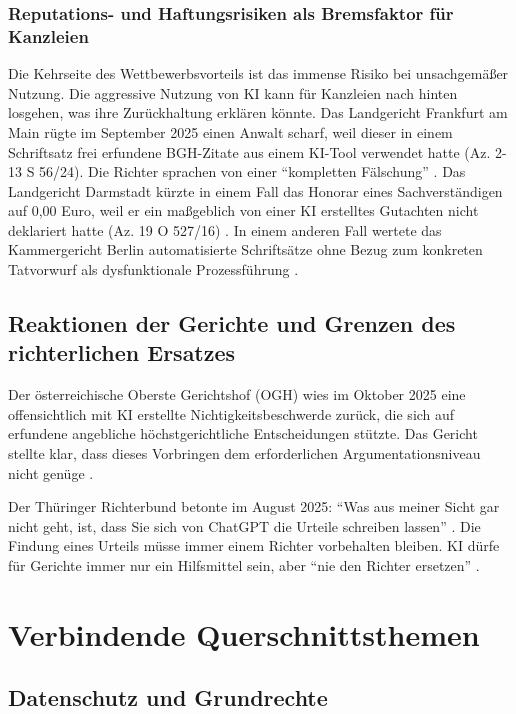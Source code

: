 \documentclass[12pt,a4paper]{article}
\begin{document}
	\subsubsection{Reputations- und Haftungsrisiken als Bremsfaktor für Kanzleien}
	Die Kehrseite des Wettbewerbsvorteils ist das immense Risiko bei unsachgemäßer Nutzung. Die aggressive Nutzung von KI kann für Kanzleien nach hinten losgehen, was ihre Zurückhaltung erklären könnte. Das Landgericht Frankfurt am Main rügte im September 2025 einen Anwalt scharf, weil dieser in einem Schriftsatz frei erfundene BGH-Zitate aus einem KI-Tool verwendet hatte (Az. 2-13 S 56/24). Die Richter sprachen von einer \enquote{kompletten Fälschung} \cite{LG Frankfurt2025}. Das Landgericht Darmstadt kürzte in einem Fall das Honorar eines Sachverständigen auf 0,00 Euro, weil er ein maßgeblich von einer KI erstelltes Gutachten nicht deklariert hatte (Az. 19 O 527/16) \cite{Kramarz2026}. In einem anderen Fall wertete das Kammergericht Berlin automatisierte Schriftsätze ohne Bezug zum konkreten Tatvorwurf als dysfunktionale Prozessführung \cite{KG Berlin2025}.
	
	\subsection{Reaktionen der Gerichte und Grenzen des richterlichen Ersatzes}
	
	Der österreichische Oberste Gerichtshof (OGH) wies im Oktober 2025 eine offensichtlich mit KI erstellte Nichtigkeitsbeschwerde zurück, die sich auf erfundene angebliche höchstgerichtliche Entscheidungen stützte. Das Gericht stellte klar, dass dieses Vorbringen dem erforderlichen Argumentationsniveau nicht genüge \cite{OGH2025}.
	
	Der Thüringer Richterbund betonte im August 2025: \enquote{Was aus meiner Sicht gar nicht geht, ist, dass Sie sich von ChatGPT die Urteile schreiben lassen} \cite{Richterbund2025}. Die Findung eines Urteils müsse immer einem Richter vorbehalten bleiben. KI dürfe für Gerichte immer nur ein Hilfsmittel sein, aber \enquote{nie den Richter ersetzen} \cite{Richterbund2025}.
	
	\section{Verbindende Querschnittsthemen}
	
	\subsection{Datenschutz und Grundrechte}
	
\end{document}
